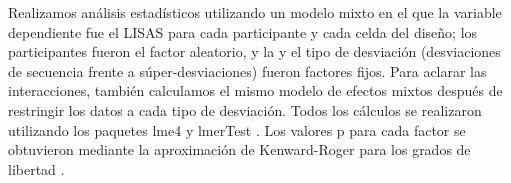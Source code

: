 Realizamos análisis estadísticos utilizando un modelo mixto en el que la variable dependiente fue el LISAS para cada participante y cada celda del diseño; los participantes fueron el factor aleatorio, y la \mdlbin y el tipo de desviación (desviaciones de secuencia frente a súper-desviaciones) fueron factores fijos. Para aclarar las interacciones, también calculamos el mismo modelo de efectos mixtos después de restringir los datos a cada tipo de desviación. Todos los cálculos se realizaron utilizando los paquetes lme4 \cite{f137} y lmerTest \cite{f138}. Los valores p para cada factor se obtuvieron mediante la aproximación de Kenward-Roger para los grados de libertad \cite{f139}.


